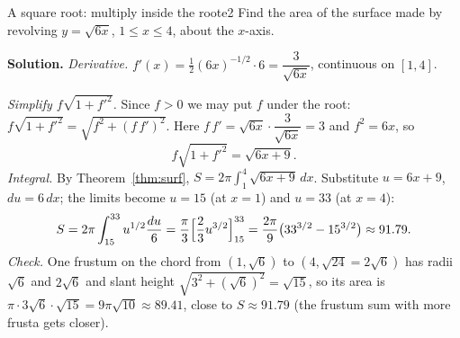 \documentclass[11pt]{article}
\begin{document}
\begin{exmp}{A square root: multiply inside the root}{e2}
Find the area of the surface made by revolving $y=\sqrt{6x}$, $1\le x\le4$, about the $x$-axis.

\textbf{Solution.} \emph{Derivative.} $f'(x)=\frac12(6x)^{-1/2}\cdot6=\dfrac3{\sqrt{6x}}$, continuous on $[1,4]$.

\emph{Simplify $f\sqrt{1+f'^2}$.} Since $f>0$ we may put $f$ under the root: $f\sqrt{1+f'^2}=\sqrt{f^2+(f\,f')^2}$. Here $f\,f'=\sqrt{6x}\cdot\dfrac3{\sqrt{6x}}=3$ and $f^2=6x$, so
\[
f\sqrt{1+f'^2}=\sqrt{6x+9}.
\]
\emph{Integral.} By Theorem~\ref{thm:surf}, $S=2\pi\int_1^4\sqrt{6x+9}\,dx$. Substitute $u=6x+9$, $du=6\,dx$; the limits become $u=15$ (at $x=1$) and $u=33$ (at $x=4$):
\[
S=2\pi\int_{15}^{33}u^{1/2}\frac{du}6=\frac\pi3\Bigl[\frac23u^{3/2}\Bigr]_{15}^{33}=\frac{2\pi}9\bigl(33^{3/2}-15^{3/2}\bigr)\approx91.79 .
\]
\emph{Check.} One frustum on the chord from $(1,\sqrt6)$ to $(4,\sqrt{24}=2\sqrt6)$ has radii $\sqrt6$ and $2\sqrt6$ and slant height $\sqrt{3^2+(\sqrt6)^2}=\sqrt{15}$, so its area is $\pi\cdot3\sqrt6\cdot\sqrt{15}=9\pi\sqrt{10}\approx89.41$, close to $S\approx91.79$ (the frustum sum with more frusta gets closer).


\end{exmp}
\end{document}
